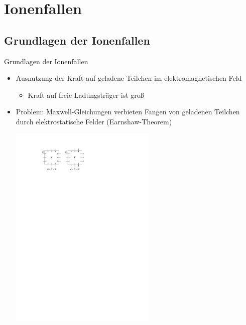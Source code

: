 \documentclass[12pt,xcolor=dvipsnames]{beamer}
\begin{document}
\section{Ionenfallen}

\subsection{Grundlagen der Ionenfallen}
\begin{frame}{Grundlagen der Ionenfallen}
	\begin{itemize}
		\item Ausnutzung der Kraft auf geladene Teilchen im elektromagnetischen Feld
			\begin{itemize}
				\item Kraft auf freie Ladungsträger ist groß
			\end{itemize}
		
		\item \alert{Problem:} Maxwell-Gleichungen verbieten Fangen von geladenen Teilchen durch elektrostatische Felder (Earnshaw-Theorem)
		
		\vspace{0.5cm}
		\centering
		\includegraphics[width=0.55\textwidth]{./figures/earnshaw.pdf}
		
	\end{itemize}
\end{frame}
\end{document}
